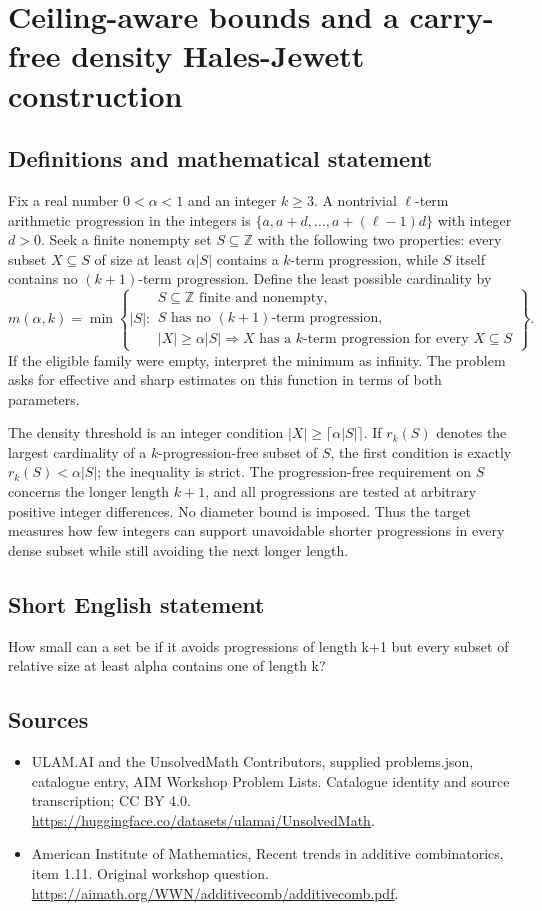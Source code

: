 \documentclass[11pt,a4paper]{article}
\begin{document}
\section*{Ceiling-aware bounds and a carry-free density Hales-Jewett construction}\label{statement}

\subsection{Definitions and mathematical statement}
Fix a real number $0<\alpha<1$ and an integer $k\ge3$.
A nontrivial $\ell$-term arithmetic progression in the integers is
$\{a,a+d,\ldots,a+(\ell-1)d\}$ with integer $d>0$.
Seek a finite nonempty set $S\subseteq\mathbb Z$ with the following
two properties: every subset $X\subseteq S$ of size at least
$\alpha|S|$ contains a $k$-term progression, while $S$ itself
contains no $(k+1)$-term progression.
Define the least possible cardinality by
\[
 m(\alpha,k)=\min\left\{|S|:
 \begin{array}{l}
 S\subseteq\mathbb Z\text{ finite and nonempty},\\
 S\text{ has no }(k+1)\text{-term progression},\\
 |X|\ge\alpha|S|\Rightarrow X\text{ has a }k\text{-term progression}
 \text{ for every }X\subseteq S
 \end{array}\right\}.
\]
If the eligible family were empty, interpret the minimum as infinity.
The problem asks for effective and sharp estimates on this function
in terms of both parameters.

The density threshold is an integer condition
$|X|\ge\lceil\alpha|S|\rceil$. If $r_k(S)$ denotes the largest
cardinality of a $k$-progression-free subset of $S$, the first
condition is exactly $r_k(S)<\alpha|S|$; the inequality is strict.
The progression-free requirement on $S$ concerns the longer length
$k+1$, and all progressions are tested at arbitrary positive integer
differences. No diameter bound is imposed. Thus the target measures
how few integers can support unavoidable shorter progressions in
every dense subset while still avoiding the next longer length.
\subsection{Short English statement}
How small can a set be if it avoids progressions of length k+1 but every subset of relative size at least alpha contains one of length k?
\subsection{Sources}
\begin{itemize}
\item[S1] ULAM.AI and the UnsolvedMath Contributors, supplied problems.json, catalogue entry, AIM Workshop Problem Lists. Catalogue identity and source transcription; CC BY 4.0.
\url{https://huggingface.co/datasets/ulamai/UnsolvedMath}.
\item[S2] American Institute of Mathematics, Recent trends in additive combinatorics, item 1.11. Original workshop question.
\url{https://aimath.org/WWN/additivecomb/additivecomb.pdf}.
\end{itemize}
\end{document}
